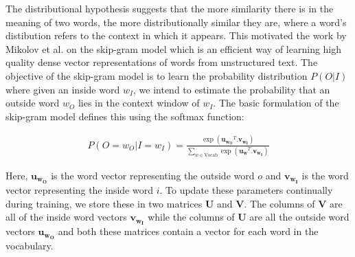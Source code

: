 The distributional hypothesis suggests that the more similarity there is in the meaning of two words, the more distributionally similar they are, where a word's distibution refers to the context in which it appears. This motivated the work by Mikolov et al. on the skip-gram model which is an efficient way of learning high quality dense vector representations of words from unstructured text. The objective of the skip-gram model is to learn the probability distribution $P(O|I)$ where given an inside word $w_I$, we intend to estimate the probability that an outside word $w_O$ lies in the context window of $w_I$. The basic formulation of the skip-gram model defines this using the softmax function:

\begin{align}
    P(O = w_O | I = w_I) = \frac{\exp(\bm{u_{w_O}}^T . \bm{v_{w_I}})}{\sum_{w \in \text{Vocab}} \exp(\bm{u_{w}}^T . \bm{v_{w_I}})}
\end{align}{}

Here, $\bm{u_{w_O}}$ is the word vector representing the outside word $o$ and $\bm{v_{w_I}}$ is the word vector representing the inside word $i$. To update these parameters continually during training, we store these in two matrices $\textbf{U}$ and $\textbf{V}$. The columns of $\textbf{V}$ are all of the inside word vectors $\bm{v_{w_I}}$ while the columns of $\textbf{U}$ are all the outside word vectors $\bm{u_{w_O}}$ and both these matrices contain a vector for each word in the vocabulary.


